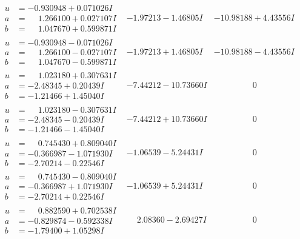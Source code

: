 \documentclass[1p]{elsarticle_modified}
\theoremstyle{definition}
\begin{document}
$$\begin{array}{c|c|c}
\begin{aligned}
u &= -0.930948 + 0.071026 I \\
a &= \phantom{-}1.266100 + 0.027107 I \\
b &= \phantom{-}1.047670 + 0.599871 I\end{aligned}
 & -1.97213 - 1.46805 I & -10.98188 + 4.43556 I \\ \hline\begin{aligned}
u &= -0.930948 - 0.071026 I \\
a &= \phantom{-}1.266100 - 0.027107 I \\
b &= \phantom{-}1.047670 - 0.599871 I\end{aligned}
 & -1.97213 + 1.46805 I & -10.98188 - 4.43556 I \\ \hline\begin{aligned}
u &= \phantom{-}1.023180 + 0.307631 I \\
a &= -2.48345 + 0.20439 I \\
b &= -1.21466 + 1.45040 I\end{aligned}
 & -7.44212 - 10.73660 I & \phantom{-0.000000 } 0 \\ \hline\begin{aligned}
u &= \phantom{-}1.023180 - 0.307631 I \\
a &= -2.48345 - 0.20439 I \\
b &= -1.21466 - 1.45040 I\end{aligned}
 & -7.44212 + 10.73660 I & \phantom{-0.000000 } 0 \\ \hline\begin{aligned}
u &= \phantom{-}0.745430 + 0.809040 I \\
a &= -0.366987 - 1.071930 I \\
b &= -2.70214 - 0.22546 I\end{aligned}
 & -1.06539 - 5.24431 I & \phantom{-0.000000 } 0 \\ \hline\begin{aligned}
u &= \phantom{-}0.745430 - 0.809040 I \\
a &= -0.366987 + 1.071930 I \\
b &= -2.70214 + 0.22546 I\end{aligned}
 & -1.06539 + 5.24431 I & \phantom{-0.000000 } 0 \\ \hline\begin{aligned}
u &= \phantom{-}0.882590 + 0.702538 I \\
a &= -0.829874 - 0.592338 I \\
b &= -1.79400 + 1.05298 I\end{aligned}
 & \phantom{-}2.08360 - 2.69427 I & \phantom{-0.000000 } 0 \\ \hline\begin{aligned}

\end{aligned}
\end{array}$$
\end{document}
